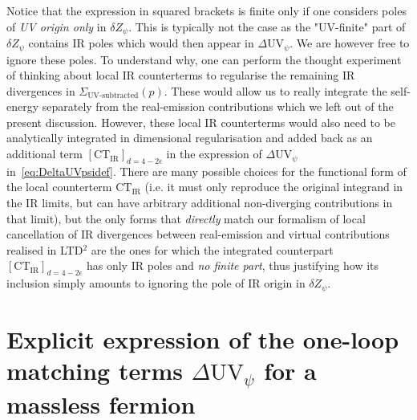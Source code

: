 \documentclass[11pt]{article}
\begin{document}
Notice that the expression in squared brackets is finite only if one considers poles of \emph{UV origin only} in $\delta Z_\psi$. This is typically not the case as the "UV-finite" part of $\delta Z_\psi$ contains IR poles which would then appear in $ \Delta \textrm{UV}_\psi $.
We are however free to ignore these poles.
To understand why, one can perform the thought experiment of thinking about local IR counterterms to regularise the remaining IR divergences in $\Sigma_{\textrm{UV-subtracted}}(p)$.
These would allow us to really integrate the self-energy separately from the real-emission contributions which we left out of the present discussion.
However, these local IR counterterms would also need to be analytically integrated in dimensional regularisation and added back as an additional term $\left [ \textrm{CT}_{\textrm{IR}} \right ]_{d=4-2\epsilon}$ in the expression of $ \Delta \textrm{UV}_\psi $ in~\eqref{eq:DeltaUVpsidef}.
There are many possible choices for the functional form of the local counterterm $\textrm{CT}_{\textrm{IR}}$ (i.e. it must only reproduce the original integrand in the IR limits, but can have arbitrary additional non-diverging contributions in that limit), but the only forms that \emph{directly} match our formalism of local cancellation of IR divergences between real-emission and virtual contributions realised in LTD$^2$ are the ones for which the integrated counterpart $\left [ \textrm{CT}_{\textrm{IR}} \right ]_{d=4-2\epsilon}$ has only IR poles and \emph{no finite part}, thus justifying how its inclusion simply amounts to ignoring the pole of IR origin in $\delta Z_\psi$.

\section{Explicit expression of the one-loop matching terms $\Delta \textrm{UV}_{\psi}$ for a massless fermion}
\label{sec::explicitDeltaUV}
\end{document}

